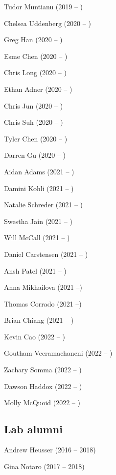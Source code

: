 \documentclass{tufte-book} %
\begin{document}
\begin{fullwidth}
\begin{multicols}{2}\raggedcolumns
\begin{list}{\quad}{}
\item Tudor Muntianu (2019 -- )
\item Chelsea Uddenberg (2020 -- )
\item Greg Han (2020 -- )
\item Esme Chen (2020 -- )
\item Chris Long (2020 -- )
\item Ethan Adner (2020 -- )
\item Chris Jun (2020 -- )
\item Chris Suh (2020 -- )
\item Tyler Chen (2020 -- )
\item Darren Gu (2020 -- )
\item Aidan Adams (2021 -- )
\item Damini Kohli (2021 -- )
\item Natalie Schreder (2021 -- )
\item Swestha Jain (2021 -- )
\item Will McCall (2021 -- )
\item Daniel Carstensen (2021 -- )
\item Ansh Patel (2021 -- )
\item Anna Mikhailova (2021 --)
\item Thomas Corrado (2021 --)
\item Brian Chiang (2021 -- )
\item Kevin Cao (2022 -- )
\item Goutham Veeramachaneni (2022 -- )
\item Zachary Somma (2022 -- )
\item Dawson Haddox (2022 -- )
\item Molly McQuoid (2022 -- )
\end{list}
\end{multicols}

\subsection{Lab alumni}
\begin{multicols}{2}\raggedcolumns
\begin{list}{\quad}{}
\item Andrew Heusser (2016 -- 2018)
\item Gina Notaro (2017 -- 2018)
\end{list}
\end{multicols}


\end{fullwidth}
\end{document}
